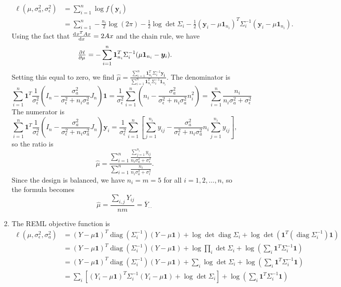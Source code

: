 \documentclass[11pt]{article}
\newcommand{\diag}{\operatorname{diag}}
\begin{document}
\begin{enumerate}
\begin{enumerate}
			\begin{align*}
				\ell(\mu,\sigma_a^2,\sigma_\epsilon^2) &= \sum_{i=1}^n \log f(\bm{y}_{i}) \\
				&= \sum_{i=1}^n -\frac{n_i}{2}\log(2\pi) - \frac{1}{2}\log\det\Sigma_i - \frac{1}{2}(\bm{y}_i - \mu\bm{1}_{n_i})^T\Sigma_i^{-1}(\bm{y}_i - \mu\bm{1}_{n_i}).
			\end{align*}
			Using the fact that $\od{x^TAx}{x} = 2Ax$ and the chain rule, we have
			\[
				\pd{\ell}{\mu} = -\sum_{i=1}^n \bm{1}_{n_i}^T \Sigma_i^{-1} (\mu\bm{1}_{n_i} - \bm{y}_i).
			\]
			Setting this equal to zero, we find $\widehat{\mu} = \frac{\sum_{i=1}^n \bm{1}_{n_i}^T \Sigma_i^{-1} \bm{y_i}}{\sum_{i=1}^n \bm{1}_{n_i}^T \Sigma_i^{-1} \bm{1}_{n_i}}$. The denominator is
			\[
				\sum_{i=1}^n \bm{1}^T \frac{1}{\sigma_\epsilon^2}(I_n - \frac{\sigma_a^2}{\sigma_\epsilon^2 + n_i\sigma_a^2} J_n)\bm{1} = \frac{1}{\sigma_\epsilon^2}\sum_{i=1}^n (n_i - \frac{\sigma_a^2}{\sigma_\epsilon^2 + n_i\sigma_a^2}n_i^2) = \sum_{i=1}^n \frac{n_i}{n_i\sigma_a^2 + \sigma_\epsilon^2}
			\]
			The numerator is
			\[
				\sum_{i=1}^n \bm{1}^T \frac{1}{\sigma_\epsilon^2}(I_n - \frac{\sigma_a^2}{\sigma_\epsilon^2 + n_i\sigma_a^2} J_n)\bm{y}_i = \frac{1}{\sigma_\epsilon^2}\sum_{i=1}^n [\sum_{j=1}^{n_i} y_{ij} - \frac{\sigma_a^2}{\sigma_\epsilon^2 + n_i\sigma_a^2}n_i \sum_{j=1}^{n_i} y_{ij}],
			\]
			so the ratio is
			\[
				\widehat{\mu} = \frac{\sum_{i=1}^n \frac{\sum_{j=1}^{n_i}y_{ij}}{n_i\sigma_a^2 + \sigma_\epsilon^2} }{\sum_{i=1}^n \frac{n_i}{n_i\sigma_a^2 + \sigma_\epsilon^2}}.
			\]
			Since the design is balanced, we have $n_i=m=5$ for all $i=1,2,\dotsc,n$, so the formula becomes
			\[
				\widehat{\mu} = \frac{\sum_{i,j} Y_{ij}}{nm} = \overline{Y}_{\cdot\cdot}
			\]
			\item The REML objective function is
			\begin{align*}
				\ell(\mu,\sigma_\epsilon^2,\sigma_a^2) &= (Y-\mu\bm{1})^T\diag(\Sigma_i^{-1})(Y-\mu\bm{1}) + \log\det\diag\Sigma_i + \log\det(\bm{1}^T(\diag\Sigma_i^{-1})\bm{1}) \\
				&= (Y-\mu\bm{1})^T\diag(\Sigma_i^{-1})(Y-\mu\bm{1}) + \log\prod_i\det\Sigma_i + \log(\sum_i\bm{1}^T\Sigma_i^{-1}\bm{1}) \\
				&= (Y-\mu\bm{1})^T\diag(\Sigma_i^{-1})(Y-\mu\bm{1}) + \sum_i\log\det\Sigma_i + \log(\sum_i\bm{1}^T\Sigma_i^{-1}\bm{1}) \\
				&= \sum_i[(Y_i-\mu\bm{1})^T\Sigma_i^{-1}(Y_i-\mu\bm{1}) + \log\det\Sigma_i] + \log(\sum_i\bm{1}^T\Sigma_i^{-1}\bm{1})
			\end{align*}

\end{enumerate}
\end{enumerate}
\end{document}
